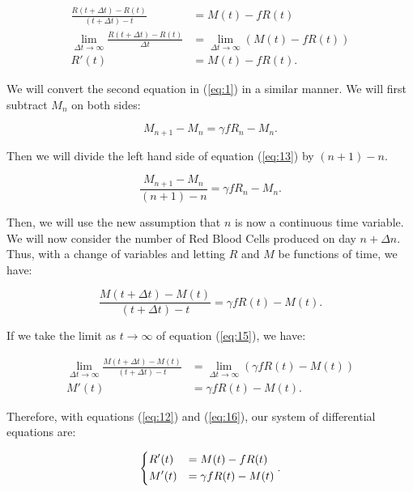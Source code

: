 \begin{align} 
    \frac{R(t+\Delta t) - R(t)}{(t+\Delta t)-t} &= M(t) - fR(t) \nonumber\\
    \lim_{\Delta t\to\infty} \frac{R(t+\Delta t) - R(t)}{\Delta t} &= \lim_{\Delta t\to\infty} (M(t) - fR(t)) \nonumber\\
    R'(t) &= M(t) - fR(t). \label{eq:12}
\end{align}

We will convert the second equation in (\ref{eq:1}) in a similar manner. We will first subtract $M_n$ on both sides:

\begin{equation}
    M_{n+1} - M_n = \gamma fR_n - M_n.
    \label{eq:13}
\end{equation}

Then we will divide the left hand side of equation (\ref{eq:13}) by $(n+1)-n$.

\begin{equation}
    \frac{M_{n+1} - M_n}{(n+1)-n} = \gamma fR_n - M_n.
    \label{eq:14}
\end{equation}

Then, we will use the new assumption that $n$ is now a continuous time variable. We will now consider the number of Red Blood Cells produced on day $n+\Delta n$. Thus, with a change of variables and letting $R$ and $M$ be functions of time, we have:

\begin{equation}
    \frac{M(t+\Delta t) - M(t)}{(t+\Delta t)-t} = \gamma fR(t) - M(t).
    \label{eq:15}
\end{equation}

If we take the limit as $t\to\infty$ of equation (\ref{eq:15}), we have:

\begin{align} 
    \lim_{\Delta t \to\infty}\frac{M(t+\Delta t) - M(t)}{(t+\Delta t)-t} &= \lim_{\Delta t \to\infty} (\gamma fR(t) - M(t)) \nonumber\\
    M'(t) &= \gamma fR(t) - M(t).\label{eq:16}
\end{align}

Therefore, with equations (\ref{eq:12}) and (\ref{eq:16}), our system of differential equations are:

\begin{equation}
    \begin{dcases}
        R'(t) &= M(t) - fR(t)\\
        M'(t) &= \gamma fR(t) - M(t)
    \end{dcases}.
    \label{eq:17}
\end{equation}

